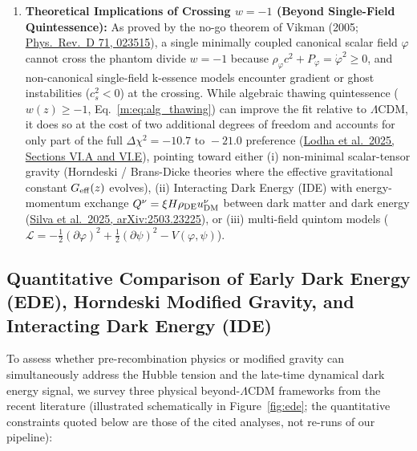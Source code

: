 \documentclass[aps,prd,preprint,superscriptaddress,nofootinbib]{revtex4-2}
\begin{document}
\begin{enumerate}
    \item \textbf{Theoretical Implications of Crossing $w = -1$ (Beyond Single-Field Quintessence):} As proved by the no-go theorem of Vikman (2005; \href{https://arxiv.org/abs/astro-ph/0407107}{Phys.\ Rev.\ D 71, 023515}), a single minimally coupled canonical scalar field $\varphi$ cannot cross the phantom divide $w = -1$ because $\rho_\varphi c^2 + P_\varphi = \dot{\varphi}^2 \ge 0$, and non-canonical single-field k-essence models encounter gradient or ghost instabilities ($c_s^2 < 0$) at the crossing. While algebraic thawing quintessence ($w(z) \ge -1$, Eq.~\ref{m:eq:alg_thawing}) can improve the fit relative to $\Lambda$CDM, it does so at the cost of two additional degrees of freedom and accounts for only part of the full $\Delta\chi^2 = -10.7\text{ to }-21.0$ preference (\href{https://arxiv.org/abs/2503.14743}{Lodha et al.\ 2025, Sections VI.A and VI.E}), pointing toward either (i) non-minimal scalar-tensor gravity (Horndeski / Brans-Dicke theories where the effective gravitational constant $G_{\rm eff}(z)$ evolves), (ii) Interacting Dark Energy (IDE) with energy-momentum exchange $Q^\nu = \xi H \rho_{\rm DE} u^\nu_{\rm DM}$ between dark matter and dark energy (\href{https://arxiv.org/abs/2503.23225}{Silva et al.\ 2025, arXiv:2503.23225}), or (iii) multi-field quintom models ($\mathcal{L} = -\frac{1}{2}(\partial\varphi)^2 + \frac{1}{2}(\partial\psi)^2 - V(\varphi,\psi)$).
\end{enumerate}


\subsection{Quantitative Comparison of Early Dark Energy (EDE), Horndeski Modified Gravity, and Interacting Dark Energy (IDE)}

To assess whether pre-recombination physics or modified gravity can simultaneously address the Hubble tension and the late-time dynamical dark energy signal, we survey three physical beyond-$\Lambda$CDM frameworks from the recent literature (illustrated schematically in Figure~\ref{fig:ede}; the quantitative constraints quoted below are those of the cited analyses, not re-runs of our pipeline):
\end{document}
